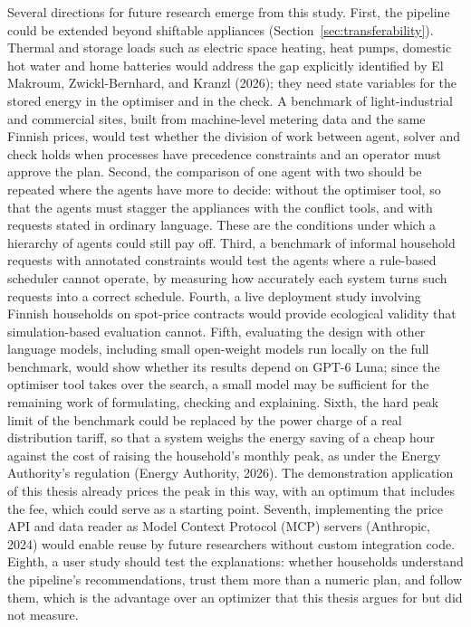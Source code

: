 \documentclass[12pt,a4paper]{report}
\begin{document}
Several directions for future research emerge from this study. First,
the pipeline could be extended beyond shiftable appliances
(Section~\ref{sec:transferability}). Thermal and storage loads such as
electric space heating, heat pumps, domestic hot water and home
batteries would address the gap explicitly identified by El Makroum,
Zwickl-Bernhard, and Kranzl (2026); they need state variables for the
stored energy in the optimiser and in the check. A benchmark of
light-industrial and commercial sites, built from machine-level metering
data and the same Finnish prices, would test whether the division of
work between agent, solver and check holds when processes have
precedence constraints and an operator must approve the plan.
Second, the comparison of one agent with two should be repeated where
the agents have more to decide: without the optimiser tool, so that the
agents must stagger the appliances with the conflict tools, and with
requests stated in ordinary language. These are the conditions under
which a hierarchy of agents could still pay off. Third, a benchmark of
informal household requests with annotated constraints would test the
agents where a rule-based scheduler cannot operate, by measuring how
accurately each system turns such requests into a correct schedule.
Fourth, a live deployment study involving Finnish households on
spot-price contracts would provide ecological validity that
simulation-based evaluation cannot. Fifth, evaluating the design with
other language models, including small open-weight models run locally on
the full benchmark, would show whether its results depend on GPT-6 Luna;
since the optimiser tool takes over the search, a small model may be
sufficient for the remaining work of formulating, checking and
explaining. Sixth, the hard peak limit of the benchmark could be
replaced by the power charge of a real distribution tariff, so that a
system weighs the energy saving of a cheap hour against the cost of
raising the household's monthly peak, as under the Energy Authority's
regulation (Energy Authority, 2026). The demonstration application of
this thesis already prices the peak in this way, with an optimum that
includes the fee, which could serve as a starting point. Seventh,
implementing the price API and data reader as Model Context Protocol
(MCP) servers (Anthropic, 2024) would enable reuse by future
researchers without custom integration code. Eighth, a user study should
test the explanations: whether households understand the pipeline's
recommendations, trust them more than a numeric plan, and follow them,
which is the advantage over an optimizer that this thesis argues for
but did not measure.
\end{document}
